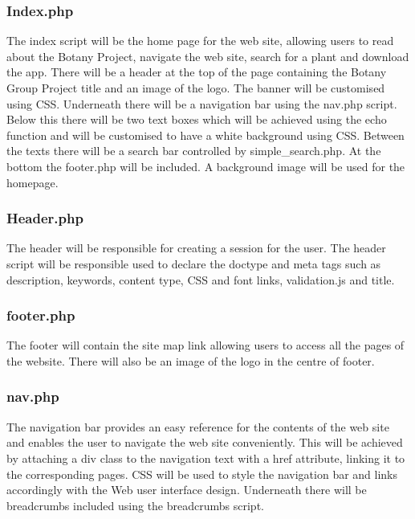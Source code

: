 	\subsubsection{Index.php}
		The index script will be the home page for the web site, allowing users to read about the Botany Project, navigate the web site, search for a plant and download the app. There will be a header at the top of the page containing the Botany Group Project title and an image of the logo. The banner will be customised using CSS. Underneath there will be a navigation bar using the nav.php script. Below this there will be two text boxes which will be achieved using the echo function and will be customised to have a white background using CSS. Between the texts there will be a search bar controlled by simple\_search.php. At the bottom the footer.php will be included. A background image will be used for the homepage.

	\subsubsection{Header.php}
		The header will be responsible for creating a session for the user. The header script will be responsible used to declare the doctype and meta tags such as description, keywords, content type, CSS and font links, validation.js and title. 

	\subsubsection{footer.php}
		The footer will contain the site map link allowing users to access all the pages of the website. There will also be an image of the logo in the centre of footer.

	\subsubsection{nav.php}
		The navigation bar provides an easy reference for the contents of the web site and enables the user to navigate the web site conveniently. This will be achieved by attaching a div class to the navigation text with a href attribute, linking it to the corresponding pages. CSS will be used to style the navigation bar and links accordingly with the Web user interface design. Underneath there will be breadcrumbs included using the breadcrumbs script.

